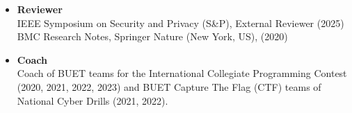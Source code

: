 \begin{itemize}
    \item \textbf{Reviewer}\\
    IEEE Symposium on Security and Privacy (S\&P), External Reviewer (2025)\\
    BMC Research Notes, Springer Nature (New York, US), (2020)
    \item \textbf{Coach}\\
    Coach of BUET teams for the International Collegiate Programming Contest (2020, 2021, 2022, 2023) and BUET Capture The Flag (CTF) teams of National Cyber Drills (2021, 2022).
\end{itemize}

\endinput 